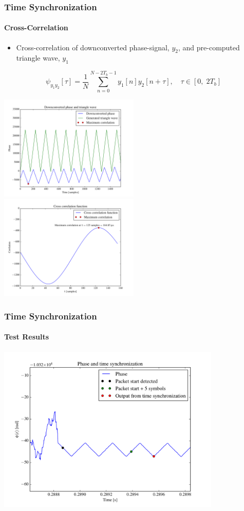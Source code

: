 \begin{frame}
    \frametitle{Time Synchronization}
    \framesubtitle{Cross-Correlation}
    \begin{itemize}
        \item Cross-correlation of downconverted phase-signal, $y_2$, and pre-computed triangle wave, $y_1$
    \end{itemize}
    \begin{equation*}
        \psi_{y_1y_2}[\tau] = \frac{1}{N}\sum_{n=0}^{N-2T_b-1} y_1[n]y_2[n+\tau], \quad \tau \in [0, \; 2T_b]
    \end{equation*}
    \begin{center}
        \includegraphics[width=0.5\textwidth]{img/phase_triang}
        \includegraphics[width=0.5\textwidth]{img/crosscorr}
    \end{center}
\end{frame}

\begin{frame} \frametitle{Time Synchronization}
    \framesubtitle{Test Results}
    \begin{center}
        \includegraphics[width=0.8\textwidth]{img/time_sync_test}
    \end{center}
\end{frame}
